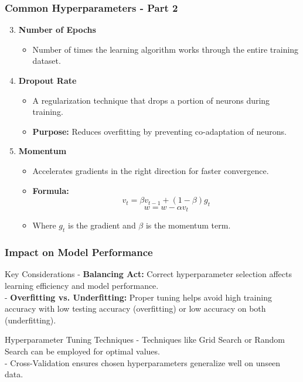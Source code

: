 \documentclass[aspectratio=169]{beamer}
\begin{document}
\begin{frame}[fragile]
    \frametitle{Common Hyperparameters - Part 2}
    \begin{enumerate}
        \setcounter{enumi}{2}
        \item \textbf{Number of Epochs}
        \begin{itemize}
            \item Number of times the learning algorithm works through the entire training dataset.
        \end{itemize}
        
        \item \textbf{Dropout Rate}
        \begin{itemize}
            \item A regularization technique that drops a portion of neurons during training.
            \item \textbf{Purpose:} Reduces overfitting by preventing co-adaptation of neurons.
        \end{itemize}
        
        \item \textbf{Momentum}
        \begin{itemize}
            \item Accelerates gradients in the right direction for faster convergence.
            \item \textbf{Formula:}
            \begin{equation}
                v_t = \beta v_{t-1} + (1 - \beta) g_t
            \end{equation}
            \begin{equation}
                w = w - \alpha v_t
            \end{equation}
            \item Where \( g_t \) is the gradient and \( \beta \) is the momentum term.
        \end{itemize}
    \end{enumerate}
\end{frame}

\begin{frame}[fragile]
    \frametitle{Impact on Model Performance}
    \begin{block}{Key Considerations}
        - \textbf{Balancing Act:} Correct hyperparameter selection affects learning efficiency and model performance.\\
        - \textbf{Overfitting vs. Underfitting:} Proper tuning helps avoid high training accuracy with low testing accuracy (overfitting) or low accuracy on both (underfitting).
    \end{block}
    
    \begin{block}{Hyperparameter Tuning Techniques}
        - Techniques like Grid Search or Random Search can be employed for optimal values.\\
        - Cross-Validation ensures chosen hyperparameters generalize well on unseen data.
    \end{block}
\end{frame}
\end{document}
